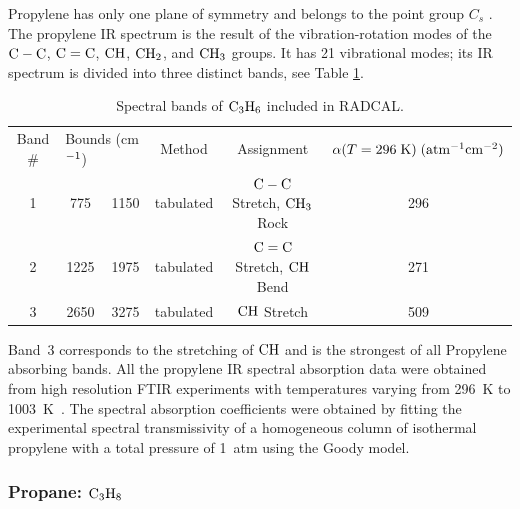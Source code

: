 Propylene has only one plane of symmetry and belongs to the point group $C_s$ \cite{Herzberg:1949}. The propylene IR spectrum is the result of the
vibration-rotation modes of the $\rm C-C$, $\rm C=C$, $\rm CH$, $\rm CH_2$, and $\rm CH_3$ groups. It has 21 vibrational modes;
its IR spectrum is divided into three distinct bands, see Table \ref{Table::C3H6}.
\begin{table}[ht]
   \centering
   \caption{Spectral bands of $\rm C_3H_6$ included in RADCAL.}
   \vspace{0.1in}
   \label{Table::C3H6}
   \begin{tabular}{|c|c|c|c|c|c|}
    \hline
    Band \# & \multicolumn{2}{|l|}{Bounds (cm$\rm ^{-1}$) } & Method & Assignment & $\alpha(T=296 \; {\rm K}) \; (\rm {atm^{-1}
cm^{-2}})$\\
    \cline{1-6}
    1 & 775  & 1150 & tabulated &  $\rm C-C$ Stretch, $\rm CH_3$ Rock & 296 \\
    2 & 1225 & 1975 & tabulated &  $\rm C=C$ Stretch, $\rm CH$ Bend   & 271 \\
    3 & 2650 & 3275 & tabulated &  $\rm CH$ Stretch                   & 509 \\
    \hline
   \end{tabular}
\end{table}
Band~3 corresponds to the stretching of $\rm CH$ and is the strongest of all Propylene absorbing bands. All the propylene IR
spectral absorption data were obtained from high resolution FTIR experiments with temperatures varying from 296~K to
1003~K~\cite{Wakatsuki:2005}. The spectral absorption coefficients were obtained by fitting the experimental spectral
transmissivity of a homogeneous column of isothermal propylene with a total pressure of 1~atm using the Goody model.

\subsubsection{Propane: $\rm C_3H_8$}

